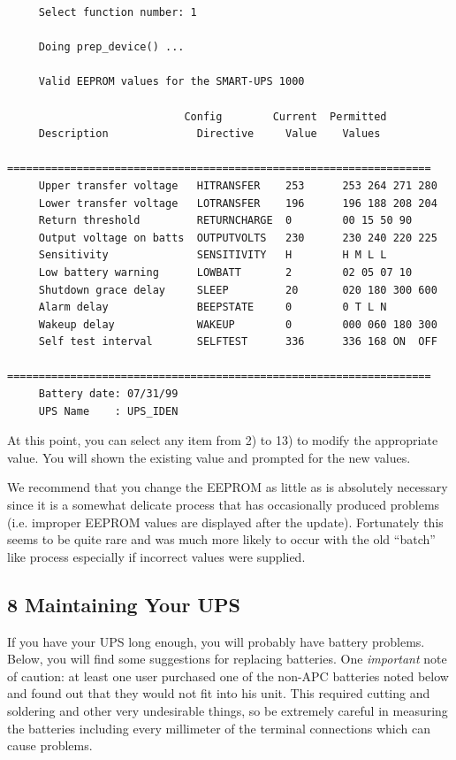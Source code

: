 {{{{{{{{{\begin{verbatim}
     Select function number: 1
     
     Doing prep_device() ...
     
     Valid EEPROM values for the SMART-UPS 1000
     
                            Config        Current  Permitted
     Description              Directive     Value    Values
     ===================================================================
     Upper transfer voltage   HITRANSFER    253      253 264 271 280
     Lower transfer voltage   LOTRANSFER    196      196 188 208 204
     Return threshold         RETURNCHARGE  0        00 15 50 90
     Output voltage on batts  OUTPUTVOLTS   230      230 240 220 225
     Sensitivity              SENSITIVITY   H        H M L L
     Low battery warning      LOWBATT       2        02 05 07 10
     Shutdown grace delay     SLEEP         20       020 180 300 600
     Alarm delay              BEEPSTATE     0        0 T L N
     Wakeup delay             WAKEUP        0        000 060 180 300
     Self test interval       SELFTEST      336      336 168 ON  OFF
     ===================================================================
     Battery date: 07/31/99
     UPS Name    : UPS_IDEN
\end{verbatim}
\normalsize

At this point, you can select any item from 2) to 13) to modify the
appropriate value. You will shown the existing value and prompted for the new
values.  

We recommend that you change the EEPROM as little as is absolutely necessary
since it is a somewhat delicate process that has occasionally produced
problems (i.e. improper EEPROM values are displayed after the update).
Fortunately this seems to be quite rare and was much more likely to occur with
the old ``batch'' like process especially if incorrect values were supplied. 

\label{Maintaining-Your-UPS}

\subsection*{8 Maintaining Your UPS}

\label{index-Maintenance-144}
If you have your UPS long enough, you will probably have battery problems.
Below, you will find some suggestions for replacing batteries. One {\it
important} note of caution: at least one user purchased one of the non-APC
batteries noted below and found out that they would not fit into his unit.
This required cutting and soldering and other very undesirable things, so be
extremely careful in measuring the batteries including every millimeter of the
terminal connections which can cause problems.  

}}}}}}}}}
